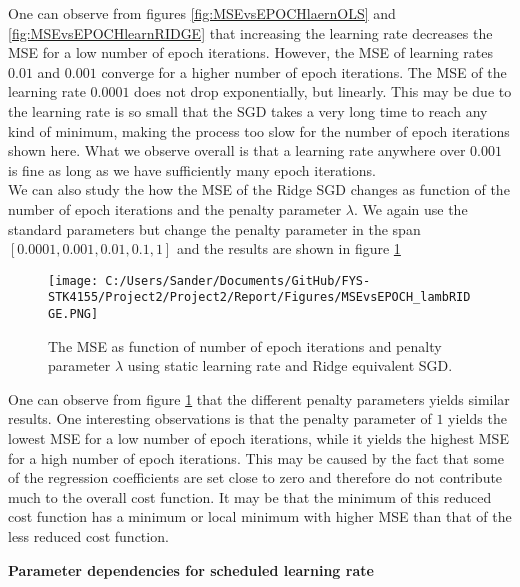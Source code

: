 \documentclass[12pt,a4paper]{article}
\begin{document}
\noindent One can observe from figures \ref{fig:MSEvsEPOCHlaernOLS} and \ref{fig:MSEvsEPOCHlearnRIDGE} that increasing the learning rate decreases the MSE for a low number of epoch iterations. However, the MSE of learning rates $0.01$ and $0.001$ converge for a higher number of epoch iterations. The MSE of the learning rate $0.0001$ does not drop exponentially, but linearly. This may be due to the learning rate is so small that the SGD takes a very long time to reach any kind of minimum, making the process too slow for the number of epoch iterations shown here. What we observe overall is that a learning rate anywhere over $0.001$ is fine as long as we have sufficiently many epoch iterations. 
\\
We can also study the how the MSE of the Ridge SGD changes as function of the number of epoch iterations and the penalty parameter $\lambda$. We again use the standard parameters but change the penalty parameter in the span $[0.0001, 0.001, 0.01, 0.1, 1]$ and the results are shown in figure \ref{fig:MSEvsEPOCHlambRIDGE}

\begin{figure}[H]
\centering
\texttt{[image: C:/Users/Sander/Documents/GitHub/FYS-STK4155/Project2/Project2/Report/Figures/MSEvsEPOCH\_lambRIDGE.PNG]}
\caption{\label{fig:MSEvsEPOCHlambRIDGE} The MSE as function of number of epoch iterations and penalty parameter $\lambda$ using static learning rate and Ridge equivalent SGD.}
\end{figure}

\noindent One can observe from figure \ref{fig:MSEvsEPOCHlambRIDGE} that the different penalty parameters yields similar results. One interesting observations is that the penalty parameter of $1$ yields the lowest MSE for a low number of epoch iterations, while it yields the highest MSE for a high number of epoch iterations. This may be caused by the fact that some of the regression coefficients are set close to zero and therefore do not contribute much to the overall cost function. It may be that the minimum of this reduced cost function has a minimum or local minimum with higher MSE than that of the less reduced cost function.

\begin{center}
\large{\textbf{Parameter dependencies for scheduled learning rate}}
\end{center}
\end{document}
